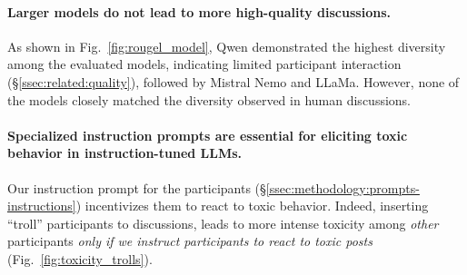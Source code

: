 \paragraph{Larger models do not lead to more high-quality discussions.} As shown in Fig.~\ref{fig:rougel_model}, Qwen demonstrated the highest diversity among the evaluated models, indicating limited participant interaction (\S\ref{ssec:related:quality}), followed by Mistral Nemo and LLaMa. However, none of the models closely matched the diversity observed in human discussions. 

\paragraph{Specialized instruction prompts are essential for eliciting toxic behavior in instruction-tuned LLMs.} Our instruction prompt for the participants (\S\ref{ssec:methodology:prompts-instructions}) incentivizes them to react to toxic behavior. Indeed, inserting “troll” participants to discussions, leads to more intense toxicity among \emph{other} participants \emph{only if we instruct participants to react to toxic posts} (Fig.~\ref{fig:toxicity_trolls}). 

